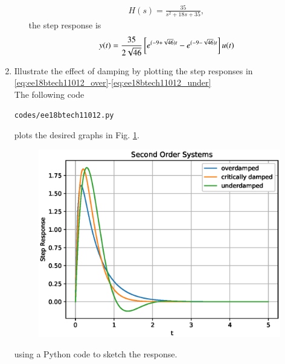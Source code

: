 \begin{enumerate}[label=\thesubsection.\arabic*.,ref=\thesubsection.\theenumi]
\begin{enumerate}
\begin{align}
H(s)=\frac{35}{s^2+18s+35},
\end{align}
the step response is
\begin{equation}
    y(t)=\frac{35}{2\sqrt{46}}{}\left[e^{(-9+\sqrt{46})t}-e^{(-9-\sqrt{46})t}\right]u(t)
\label{eq:ee18btech11012_under}
\end{equation}
\end{enumerate}
\item Illustrate the effect of damping by plotting the step responses in \eqref{eq:ee18btech11012_over}-\eqref{eq:ee18btech11012_under}
\\
\solution The following code
\begin{lstlisting}
codes/ee18btech11012.py
\end{lstlisting}
%
plots the desired graphs in
Fig.     \ref{fig:ee18btech11012}. 
%
\begin{figure}[ht!]
    \includegraphics[width=\columnwidth]{./figs/ee18btech11012.eps}
    \caption{}
    \label{fig:ee18btech11012}
\end{figure}

using a Python code to sketch the response.  
\end{enumerate}
